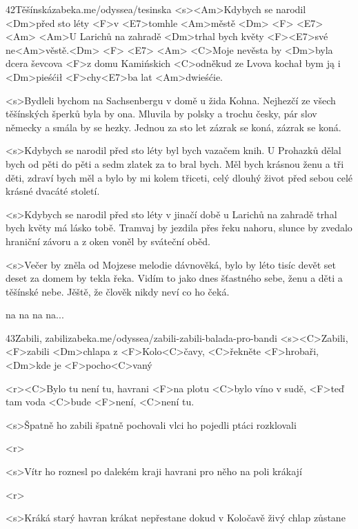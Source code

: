 \begin{song}{42}{Těšínská}{zabeka.me/odyssea/tesinska}
	<s><Am>Kdybych se narodil <Dm>před sto léty
	<F>v <E7>tomhle <Am>městě <Dm> <F> <E7> <Am>
	<Am>U Larichů na zahradě <Dm>trhal bych květy
	<F><E7>své ne<Am>věstě.<Dm> <F> <E7> <Am>
	<C>Moje nevěsta by <Dm>byla dcera ševcova
	<F>z domu Kamińskich <C>odněkud ze Lvova
	kochał bym ją i <Dm>pieśćił <F>chy<E7>ba lat <Am>dwieśćie.

	<s>Bydleli bychom na Sachsenbergu v domě u žida Kohna.
	Nejhezčí ze všech těšínských šperků byla by ona.
	Mluvila by polsky a trochu česky,
	pár slov německy a smála by se hezky.
	Jednou za sto let zázrak se koná, zázrak se koná.

	<s>Kdybych se narodil před sto léty byl bych vazačem knih.
	U Prohazků dělal bych od pěti do pěti a sedm zlatek za to bral bych.
	Měl bych krásnou ženu a tři děti,
	zdraví bych měl a bylo by mi kolem třiceti,
	celý dlouhý život před sebou celé krásné dvacáté století.

	<s>Kdybych se narodil před sto léty v jinačí době
	u Larichů na zahradě trhal bych květy má lásko tobě.
	Tramvaj by jezdila přes řeku nahoru,
	slunce by zvedalo hraniční závoru
	a z oken voněl by sváteční oběd.

	<s>Večer by zněla od Mojzese melodie dávnověká,
	bylo by léto tisíc devět set deset za domem by tekla řeka.
	Vidím to jako dnes šťastného sebe,
	ženu a děti a těšínské nebe.
	Jěště, že člověk nikdy neví co ho čeká.

	na na na na...

\end{song}
\begin{song}{43}{Zabili, zabili}{zabeka.me/odyssea/zabili-zabili-balada-pro-bandi}
	<s><C>Zabili, <F>zabili <Dm>chlapa z <F>Kolo<C>čavy,
	<C>řekněte <F>hrobaři, <Dm>kde je <F>pocho<C>vaný

	<r><C>Bylo tu není tu, havrani <F>na plotu
	<C>bylo víno v sudě, <F>teď tam voda <C>bude
	<F>není, <C>není tu.

	<s>Špatně ho zabili
	špatně pochovali
	vlci ho pojedli
	ptáci rozklovali

	<r>

	<s>Vítr ho roznesl
	po dalekém kraji
	havrani pro něho
	na poli krákají

	<r>

	<s>Kráká starý havran
	krákat nepřestane
	dokud v Koločavě
	živý chlap zůstane

\end{song}
